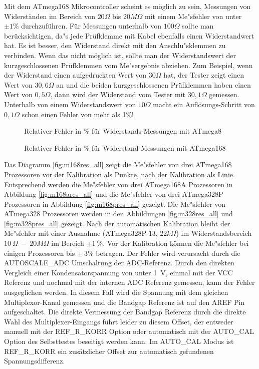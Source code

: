 Mit dem ATmega168 Mikrocontroller scheint es m\"oglich zu sein, Messungen von Widerst\"anden im
Bereich von \(20\Omega\) bis \(20M\Omega\) mit einem Me"sfehler von unter \(\pm1\%\) durchzuf\"uhren.
F\"ur Messungen unterhalb von \(100\Omega\) sollte man ber\"ucksichtigen, da"s jede Pr\"ufklemme mit Kabel ebenfalls
einen Widerstandwert hat.
Es ist besser, den Widerstand direkt mit den Anschlu"sklemmen zu verbinden.
Wenn das nicht m\"oglich ist, sollte man der Widerstandswert der kurzgeschlossenen Pr\"ufklemmen vom Me"sergebnis abziehen.
Zum Beispiel, wenn der Widerstand einen aufgedruckten Wert von \(30\Omega\) hat, der Tester zeigt
einen Wert von \(30,6\Omega\) an
und die beiden kurzgeschlossenen Pr\"ufklemmen haben einen Wert von \(0,5\Omega\), dann wird der Widerstand vom
Tester mit \(30,1\Omega\) gemessen.
Unterhalb von einem Widerstandswert von \(10\Omega\) macht ein Aufl\"osungs-Schritt von \(0,1\Omega\) schon einen Fehler von mehr als 1\%!

\begin{figure}[H]
\centering

\caption{Relativer Fehler in \% f\"ur Widerstands-Messungen mit ATmega8 }
\label{fig:mega8res}
\end{figure}

\begin{figure}[H]
\centering

\caption{Relativer Fehler in \% f\"ur Widerstand-Messungen mit ATmega168 }
\label{fig:mega168res}
\end{figure}

Das Diagramm \ref{fig:m168res_all} zeigt die Me"sfehler von drei ATmega168 Prozessoren vor der Kalibration als Punkte, nach der
Kalibration als Linie. Entsprechend werden die Me"sfehler von drei ATmega168A Prozessoren in Abbildung \ref{fig:m168ares_all} und
die Me"sfehler von drei ATmega328P Prozessoren in Abbildung \ref{fig:m168pres_all} gezeigt.
Die Me"sfehler von ATmega328 Prozessoren werden in den Abbildungen \ref{fig:m328res_all} und \ref{fig:m328pres_all} gezeigt.
Nach der automatischen Kalibration bleibt der Me"sfehler mit einer Ausnahme (ATmega328P-13, \(22 k\Omega\)) im Widerstandsbereich
\(10~\Omega~-~20 M\Omega\) im Bereich \(\pm1~\%\).
Vor der Kalibration k\"onnen die Me"sfehler bei einigen Prozessoren bis \(\pm~3\%\) betragen.
Der Fehler wird verursacht durch die AUTOSCALE\_ADC Umschaltung der ADC-Referenz.
Durch den direkten Vergleich einer Kondensatorspannung von unter 1~V, einmal mit der VCC Referenz und nochmal mit
der internen ADC Referenz gemessen, kann der Fehler ausgeglichen werden.
In diesem Fall wird die Spannung mit dem gleichen Multiplexor-Kanal gemessen und die Bandgap Referenz ist auf den AREF Pin
aufgeschaltet.
Die direkte Vermessung der Bandgap Referenz durch die direkte Wahl des Multiplexer-Eingangs f\"uhrt leider zu diesem Offset,
der entweder manuell mit der REF\_R\_KORR Option oder automatisch mit der AUTO\_CAL Option des Selbsttestes beseitigt werden kann.
Im AUTO\_CAL Modus ist REF\_R\_KORR ein zus\"atzlicher Offset zur automatisch gefundenen Spannungsdifferenz.

